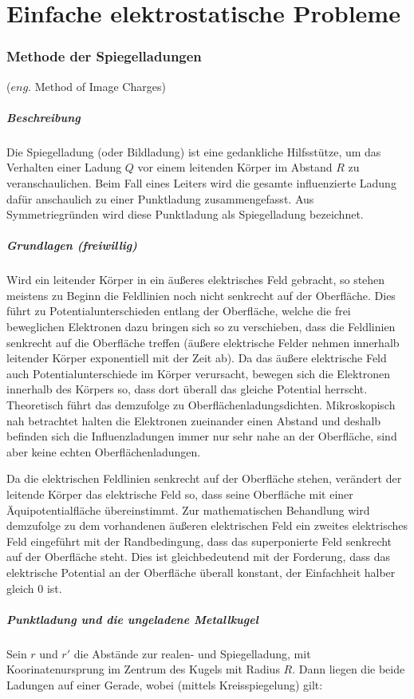 \documentclass[titlepage,11pt,a4paper,ngerman]{report}
\renewcommand{\paragraph}[1]{\subsubsection{#1}}
\begin{document}
\newpage
\section{Einfache elektrostatische Probleme}
\paragraph{Methode der Spiegelladungen}
($eng.$ Method of Image Charges)

\subparagraph{Beschreibung}
Die Spiegelladung (oder Bildladung) ist eine gedankliche Hilfsstütze, um das Verhalten einer Ladung $Q$ vor einem leitenden Körper im Abstand $R$ zu veranschaulichen. Beim Fall eines Leiters wird die gesamte influenzierte Ladung dafür anschaulich zu einer Punktladung zusammengefasst. Aus Symmetriegründen wird diese Punktladung als Spiegelladung bezeichnet.

\small{\subparagraph{Grundlagen (freiwillig)}
Wird ein leitender Körper in ein äußeres elektrisches Feld gebracht, so stehen meistens zu Beginn die Feldlinien noch nicht senkrecht auf der Oberfläche. Dies führt zu Potentialunterschieden entlang der Oberfläche, welche die frei beweglichen Elektronen dazu bringen sich so zu verschieben, dass die Feldlinien senkrecht auf die Oberfläche treffen (äußere elektrische Felder nehmen innerhalb leitender Körper exponentiell mit der Zeit ab). Da das äußere elektrische Feld auch Potentialunterschiede im Körper verursacht, bewegen sich die Elektronen innerhalb des Körpers so, dass dort überall das gleiche Potential herrscht. Theoretisch führt das demzufolge zu Oberflächenladungsdichten. Mikroskopisch nah betrachtet halten die Elektronen zueinander einen Abstand und deshalb befinden sich die Influenzladungen immer nur sehr nahe an der Oberfläche, sind aber keine echten Oberflächenladungen.
\par
Da die elektrischen Feldlinien senkrecht auf der Oberfläche stehen, verändert der leitende Körper das elektrische Feld so, dass seine Oberfläche mit einer Äquipotentialfläche übereinstimmt. Zur mathematischen Behandlung wird demzufolge zu dem vorhandenen äußeren elektrischen Feld ein zweites elektrisches Feld eingeführt mit der Randbedingung, dass das superponierte Feld senkrecht auf der Oberfläche steht. Dies ist gleichbedeutend mit der Forderung, dass das elektrische Potential an der Oberfläche überall konstant, der Einfachheit halber gleich 0 ist.}

\subparagraph{Punktladung und die ungeladene Metallkugel}
Sein $r$ und $r'$ die Abstände zur realen- und Spiegelladung, mit Koorinatenursprung im Zentrum des Kugels mit Radius $R$. Dann liegen die beide Ladungen auf einer Gerade, wobei (mittels Kreisspiegelung) gilt:
\end{document}
